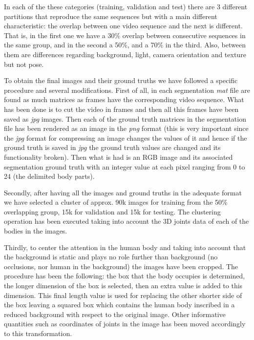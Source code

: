 In each of the these categories (training, validation and test) there are 3 different partitions that reproduce the same sequences but with a main different characteristic: the overlap between one video sequence and the next is different. That is, in the first one we have a 30$\%$ overlap between consecutive sequences in the same group, and in the second a 50$\%$, and a 70$\%$ in the third. Also, between them are differences regarding background, light, camera orientation and texture but not pose. \newline

To obtain the final images and their ground truths we have followed a specific procedure and several modifications. First of all, in each segmentation \textit{mat} file are found as much matrices as frames have the corresponding video sequence. What has been done is to cut the video in frames and then all this frames have been saved as \textit{jpg} images. Then each of the ground truth matrices in the segmentation file has been rendered as an image in the \textit{png} format (this is very important since the \textit{jpg} format for compressing an image changes the values of it and hence if the ground truth is saved in \textit{jpg} the ground truth values are changed and its functionality broken). Then what is had is an RGB image and its associated segmentation ground truth with an integer value at each pixel ranging from 0 to 24 (the delimited body parts). \newline

Secondly, after having all the images and ground truths in the adequate format we have selected a cluster of approx. 90k images for training from the 50$\%$ overlapping group, 15k for validation and 15k for testing. The clustering operation has been executed taking into account the 3D joints data of each of the bodies in the images.\newline

Thirdly, to center the attention in the human body and taking into account that the background is static and plays no role further than background (no occlusions, nor human in the background) the images have been cropped. The procedure has been the following: the box that the body occupies is determined, the longer dimension of the box is selected, then an extra value is added to this dimension. This final length value is used for replacing the other shorter side of the box leaving a squared box which contains the human body inscribed in a reduced background with respect to the original image. Other informative quantities such as coordinates of joints in the image has been moved accordingly to this transformation. \newline

